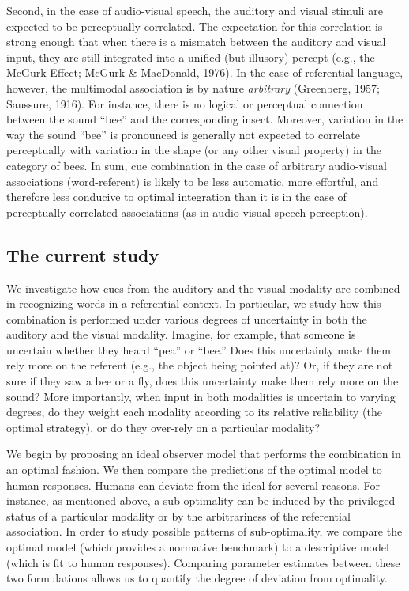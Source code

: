 \documentclass[english,floatsintext,man]{apa6}
\theoremstyle{definition}
\theoremstyle{definition}
\theoremstyle{definition}
\theoremstyle{remark}
\begin{document}
Second, in the case of audio-visual speech, the auditory and visual
stimuli are expected to be perceptually correlated. The expectation for
this correlation is strong enough that when there is a mismatch between
the auditory and visual input, they are still integrated into a unified
(but illusory) percept (e.g., the McGurk Effect; McGurk \& MacDonald,
1976). In the case of referential language, however, the multimodal
association is by nature \emph{arbitrary} (Greenberg, 1957; Saussure,
1916). For instance, there is no logical or perceptual connection
between the sound \enquote{bee} and the corresponding insect. Moreover,
variation in the way the sound \enquote{bee} is pronounced is generally
not expected to correlate perceptually with variation in the shape (or
any other visual property) in the category of bees. In sum, cue
combination in the case of arbitrary audio-visual associations
(word-referent) is likely to be less automatic, more effortful, and
therefore less conducive to optimal integration than it is in the case
of perceptually correlated associations (as in audio-visual speech
perception).

\subsection{The current study}\label{the-current-study}

We investigate how cues from the auditory and the visual modality are
combined in recognizing words in a referential context. In particular,
we study how this combination is performed under various degrees of
uncertainty in both the auditory and the visual modality. Imagine, for
example, that someone is uncertain whether they heard \enquote{pea} or
\enquote{bee.} Does this uncertainty make them rely more on the referent
(e.g., the object being pointed at)? Or, if they are not sure if they
saw a bee or a fly, does this uncertainty make them rely more on the
sound? More importantly, when input in both modalities is uncertain to
varying degrees, do they weight each modality according to its relative
reliability (the optimal strategy), or do they over-rely on a particular
modality?

We begin by proposing an ideal observer model that performs the
combination in an optimal fashion. We then compare the predictions of
the optimal model to human responses. Humans can deviate from the ideal
for several reasons. For instance, as mentioned above, a sub-optimality
can be induced by the privileged status of a particular modality or by
the arbitrariness of the referential association. In order to study
possible patterns of sub-optimality, we compare the optimal model (which
provides a normative benchmark) to a descriptive model (which is fit to
human responses). Comparing parameter estimates between these two
formulations allows us to quantify the degree of deviation from
optimality.
\end{document}
